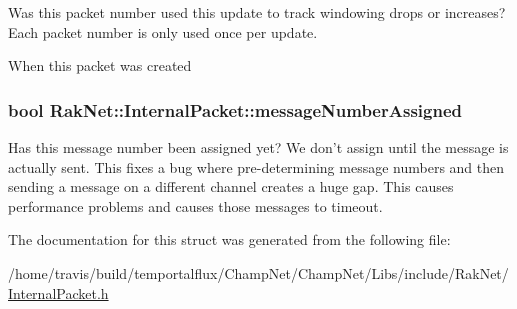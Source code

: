 Was this packet number used this update to track windowing drops or increases? Each packet number is only used once per update. 

When this packet was created \hypertarget{struct_rak_net_1_1_internal_packet_a19d5b9586b9fea9af6152705dd031b51}{
\subsubsection[{message\-Number\-Assigned}]{\setlength{\rightskip}{0pt plus 5cm}bool Rak\-Net\-::\-Internal\-Packet\-::message\-Number\-Assigned}}\label{struct_rak_net_1_1_internal_packet_a19d5b9586b9fea9af6152705dd031b51}
Has this message number been assigned yet? We don't assign until the message is actually sent. This fixes a bug where pre-\/determining message numbers and then sending a message on a different channel creates a huge gap. This causes performance problems and causes those messages to timeout. 

The documentation for this struct was generated from the following file\-:\begin{DoxyCompactItemize}
\item 
/home/travis/build/temportalflux/\-Champ\-Net/\-Champ\-Net/\-Libs/include/\-Rak\-Net/\hyperlink{_internal_packet_8h}{Internal\-Packet.\-h}\end{DoxyCompactItemize}

